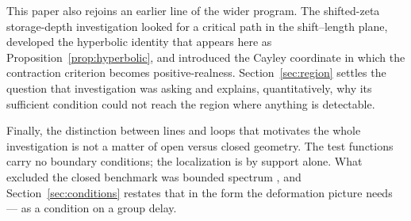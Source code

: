 This paper also rejoins an earlier line of the wider program. The shifted-zeta
storage-depth investigation \cite{CriticalPath,CumulativePath} looked for a
critical path in the shift--length plane, developed the hyperbolic identity that
appears here as Proposition~\ref{prop:hyperbolic}, and introduced the Cayley
coordinate in which the contraction criterion becomes positive-realness.
Section~\ref{sec:region} settles the question that investigation was asking and
explains, quantitatively, why its sufficient condition could not reach the region
where anything is detectable.

Finally, the distinction between lines and loops that motivates the whole
investigation is not a matter of open versus closed geometry. The test functions
carry no boundary conditions; the localization is by support alone. What excluded
the closed benchmark was bounded spectrum \cite{Selection,Bottleneck}, and
Section~\ref{sec:conditions} restates that in the form the deformation picture
needs --- as a condition on a group delay.
